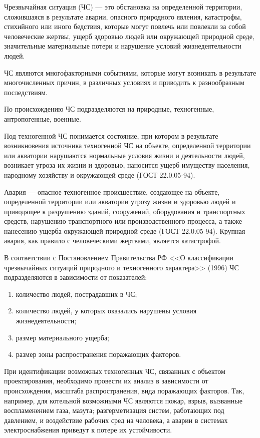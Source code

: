 Чрезвычайная ситуация (ЧС) --- это обстановка на определенной территории, сложившаяся в результате аварии, опасного природного явления, катастрофы, стихийного или иного бедствия, которые могут повлечь или повлекли за собой человеческие жертвы, ущерб здоровью людей или окружающей природной среде, значительные материальные потери и нарушение условий жизнедеятельности людей.

ЧС являются многофакторными событиями, которые могут возникать в результате многочисленных причин, в различных условиях и приводить к разнообразным последствиям.

По происхождению ЧС подразделяются на природные, техногенные, антропогенные, военные.

Под техногенной ЧС понимается состояние, при котором в результате возникновения источника техногенной ЧС на объекте, определенной территории или акватории нарушаются нормальные условия жизни и деятельности людей, возникает угроза их жизни и здоровью, наносится ущерб имуществу населения, народному хозяйству и окружающей среде (ГОСТ 22.0.05-94).

Авария --- опасное техногенное происшествие, создающее на объекте, определенной территории или акватории угрозу жизни и здоровью людей и приводящее к разрушению зданий, сооружений, оборудования и транспортных средств, нарушению транспортного или производственного процесса, а также нанесению ущерба окружающей природной среде (ГОСТ 22.0.05-94). Крупная авария, как правило с человеческими жертвами, является катастрофой.

В соответствии с Постановлением Правительства РФ <<О классификации чрезвычайных ситуаций природного и техногенного характера>> (1996) ЧС подразделяются в зависимости от показателей:

\begin{enumerate}
	\item количество людей, пострадавших в ЧС;
	\item количество людей, у которых оказались нарушены условия жизнедеятельности;
	\item размер материального ущерба;
	\item размер зоны распространения поражающих факторов.
\end{enumerate}

При идентификации возможных техногенных ЧС, связанных с объектом проектирования, необходимо провести их анализ в зависимости от происхождения, масштаба распространения, вида поражающих факторов.
Так, например, для котельной возможными ЧС являются пожар, взрыв, вызванные воспламенением газа, мазута; разгерметизация систем, работающих под давлением, и воздействие рабочих сред на человека, а аварии в системах электроснабжения приведут к потере их устойчивости.

